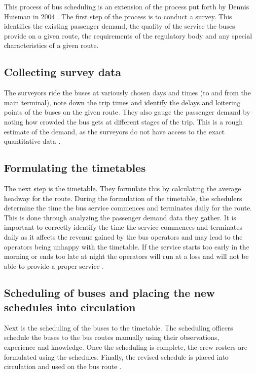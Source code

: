 This process of bus scheduling is an extension of the process put forth by Dennis Huisman in 2004 \cite{Piyadasa2005}. The first step of the process is to conduct a survey. This identifies the existing passenger demand, the quality of the service the buses provide on a given route, the requirements of the regulatory body and any special characteristics of a given route. 

\subsection{Collecting survey data}

The surveyors ride the buses at variously chosen days and times (to and from the main terminal), note down the trip times and identify the delays and loitering points of the buses on the given route. They also gauge the passenger demand by noting how crowded the bus gets at different stages of the trip. This is a rough estimate of the demand, as the surveyors do not have access to the exact quantitative data \cite{Mahesh2013a, Theja2013a, Mahesh2013b, Navaratne2013a, Navaratne2013b}.

\subsection{Formulating the timetables}

The next step is the timetable. They formulate this by calculating the average headway for the route. During the formulation of the timetable, the schedulers determine the time the bus service commences and terminates daily for the route. This is done through analyzing the passenger demand data they gather. It is important to correctly identify the time the service commences and terminates daily as it affects the revenue gained by the bus operators and may lead to the operators being unhappy with the timetable. If the service starts too early in the morning or ends too late at night the operators will run at a loss and will not be able to provide a proper service \cite{Mahesh2013a, Theja2013a, Mahesh2013b, Navaratne2013a, Navaratne2013b}.

\subsection{Scheduling of buses and placing the new schedules into circulation}

Next is the scheduling of the buses to the timetable. The scheduling officers schedule the buses to the bus routes manually using their observations, experience and knowledge. Once the scheduling is complete, the crew rosters are formulated using the schedules. Finally, the revised schedule is placed into circulation and used on the bus route \cite{Mahesh2013a, Theja2013a, Mahesh2013b, Navaratne2013a, Navaratne2013b}.

